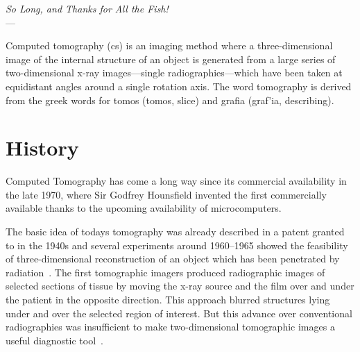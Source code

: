 \label{ch:ct}
\begin{flushright}{\slshape    
		So Long, and Thanks for All the Fish!} \\ \medskip
    ---  \citep{Adams1984}
\end{flushright}
\bigskip
Computed tomography (\acs{cs}) is an imaging method where a three-dimensional image of the internal structure of an object is generated from a large series of two-dimensional x-ray images---single radiographies---which have been taken at equidistant angles
around a single rotation axis. The word tomography is derived from the greek words for tomos (\greektext tomos\latintext, slice) and grafia (\greektext graf'ia\latintext, describing).

\section{History}
Computed Tomography has come a long way since its commercial availability in the late 1970, where Sir Godfrey Hounsfield invented the first commercially available thanks to the upcoming availability of microcomputers.

The basic idea of todays tomography was already described in a patent granted to \citet{Frank1942} in the 1940s and several experiments around 1960--1965 showed the feasibility of three-dimensional reconstruction of an object which has been penetrated by radiation~\cite{Hsieh2003}. The first tomographic imagers produced radiographic images of selected sections of tissue by moving the x-ray source and the film over and under the patient in the opposite direction. This approach blurred structures lying under and over the selected region of interest. But this advance over conventional radiographies was insufficient to make two-dimensional tomographic images a useful diagnostic tool~\cite{Robb2003}.

